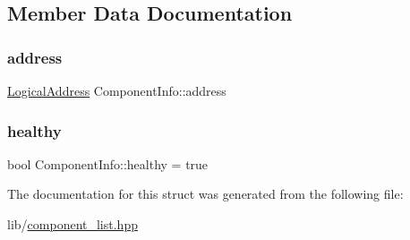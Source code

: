 \subsection{Member Data Documentation}
\mbox{\label{structComponentInfo_a0ebb1e5717838ca670048317eeda0bed}} 
\subsubsection{\texorpdfstring{address}{address}}
{\footnotesize\ttfamily \hyperlink{structLogicalAddress}{Logical\+Address} Component\+Info\+::address}

\mbox{\label{structComponentInfo_af3eec118fc95855cf27a9825f04a659c}} 
\subsubsection{\texorpdfstring{healthy}{healthy}}
{\footnotesize\ttfamily bool Component\+Info\+::healthy = true}



The documentation for this struct was generated from the following file\+:\begin{DoxyCompactItemize}
\item 
lib/\hyperlink{component__list_8hpp}{component\+\_\+list.\+hpp}\end{DoxyCompactItemize}
